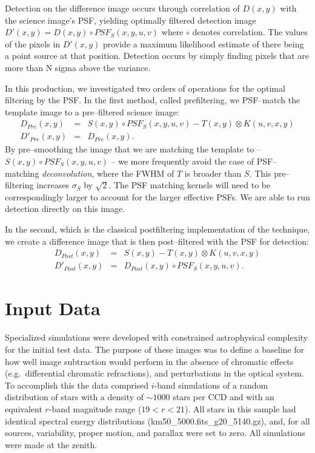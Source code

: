 \documentclass[prd, nofootinbib, floatfix, 11pt,tightenlines,times]{article}
\begin{document}
Detection on the difference image occurs through correlation of
$D(x,y)$ with the science image's PSF, yielding optimally filtered
detection image $D'(x,y) = D(x,y) \circ PSF_S(x,y,u,v)$ where $\circ$
denotes correlation.  The values of the pixels in $D'(x,y)$ provide a
maximum likelihood estimate of there being a point source at that
position.  Detection occurs by simply finding pixels that are more
than N sigma above the variance.  

In this production, we investigated two orders of operations for the
optimal filtering by the PSF.  In the first method, called
prefiltering, we PSF--match the template image to a pre--filtered
science image:
\begin{eqnarray}
D_{Pre}(x,y) & = & S(x,y) \circ PSF_S(x,y,u,v) - T(x,y) \otimes K(u,v,x,y) \nonumber \\ 
D'_{Pre}(x,y) & = & D_{Pre}(x,y). \nonumber 
\end{eqnarray}
By pre--smoothing the image that we are matching the template to --
$S(x,y) \circ PSF_S(x,y,u,v)$ -- we more frequently avoid the case of
PSF--matching {\it deconvolution}, where the FWHM of $T$ is broader
than $S$.  This pre--filtering increases $\sigma_S$ by $\sqrt{2}$.
The PSF matching kernels will need to be correspondingly larger to
account for the larger effective PSFs.  We are able to run detection
directly on this image.

In the second, which is the classical postfiltering implementation of
the technique, we create a difference image that is then
post--filtered with the PSF for detection:
\begin{eqnarray}
D_{Post}(x,y) & = & S(x,y) - T(x,y) \otimes K(u,v,x,y) \nonumber \\ 
D'_{Post}(x,y) & = & D_{Post}(x,y) \circ PSF_S(x,y,u,v).  \nonumber 
\end{eqnarray}


\section{Input Data}

Specialized simulations were developed with constrained astrophysical
complexity for the initial test data. The purpose of these images was
to define a baseline for how well image subtraction would perform in
the absence of chromatic effects (e.g.\ differential chromatic
refractions), and perturbations in the optical system. To accomplish
this the data comprised $i$-band simulations of a random distribution
of stars with a density of $\sim 1000$ stars per CCD and with an
equivalent $r$-band magnitude range ($19<r<21$). All stars in this
sample had identical spectral energy distributions
(km50\_5000.fits\_g20\_5140.gz), and, for all sources, variability,
proper motion, and parallax were set to zero. All simulations were
made at the zenith.
\end{document}
